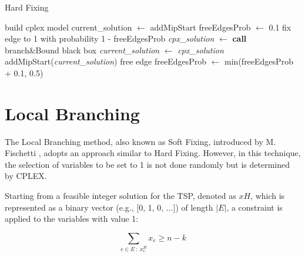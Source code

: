 \begin{algorithm}[H]
    \caption{Hard Fixing}
    \label{alg:hard_fixing}
    \begin{spacing}{1.2} %
        \BlankLine
        build cplex model\;
        current\_solution $\leftarrow$ addMipStart\;
        freeEdgesProb $\leftarrow$ 0.1\;
        \BlankLine
        {
            {
                {
                    fix edge to 1 with probability 1 - freeEdgesProb\;
                }
            }
            \BlankLine\BlankLine
            \textit{cpx\_solution} $\leftarrow$ \textbf{call} branch\&Bound black box\;
            \BlankLine\BlankLine
            {
                \textit{current\_solution} $\leftarrow$ \textit{cpx\_solution}\;
                addMipStart(\textit{current\_solution})\;
            }
            \BlankLine
            {
                free edge\;
            }
            \BlankLine
            {
                freeEdgesProb $\leftarrow$ min(freeEdgesProb + 0.1, 0.5)\;
            }
        }
    \end{spacing}
\end{algorithm}

\section{Local Branching}
\label{chap:local_branching}

The Local Branching method, also known as Soft Fixing, introduced by M. Fischetti \cite{Fischetti2003}, adopts an approach similar to Hard Fixing. However, in this technique, the selection of variables to be set to 1 is not done randomly but is determined by CPLEX.

\newpage

\noindent Starting from a feasible integer solution for the TSP, denoted as \(xH\), which is represented as a binary vector (e.g., [0, 1, 0, ...]) of length \(|E|\), a constraint is applied to the variables with value 1:

\begin{equation}
    \sum_{e \in E\ :\ x_{e}^{H}} x_e \geq n - k
    \label{eq:loc_fix_2}
\end{equation}

